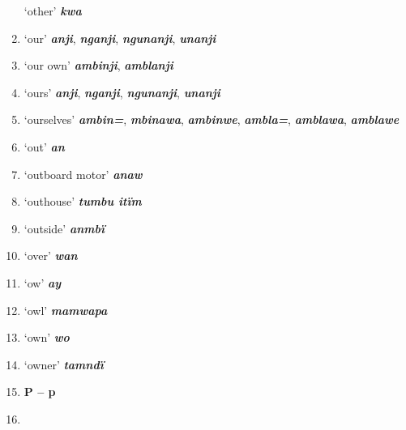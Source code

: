 \begin{enumerate}[noitemsep, label={}, align=left, widest=190, labelsep=1ex,leftmargin=*,itemindent=-10pt]
‘other’ \textbf{\textit{kwa}} \item
‘our’ \textbf{\textit{anji}}, \textbf{\textit{nganji}}, \textbf{\textit{ngunanji}}, \textbf{\textit{unanji}} \item
‘our own’ \textbf{\textit{ambinji}}, \textbf{\textit{amblanji}} \item
‘ours’ \textbf{\textit{anji}}, \textbf{\textit{nganji}}, \textbf{\textit{ngunanji}}, \textbf{\textit{unanji}} \item
‘ourselves’ \textbf{\textit{ambin=}}, \textbf{\textit{mbinawa}}, \textbf{\textit{ambinwe}}, \textbf{\textit{ambla=}}, \textbf{\textit{amblawa}}, \textbf{\textit{amblawe}} \item
‘out’ \textbf{\textit{an}} \item
‘outboard motor’ \textbf{\textit{anaw}} \item
‘outhouse’ \textbf{\textit{tumbu itïm}} \item
‘outside’ \textbf{\textit{anmbï}} \item
‘over’ \textbf{\textit{wan}} \item
‘ow’ \textbf{\textit{ay}} \item
‘owl’ \textbf{\textit{mamwapa}} \item
‘own’ \textbf{\textit{wo}} \item
‘owner’ \textbf{\textit{tamndï}}\\ \item

\noindent \textbf{P – p}\\ \item


\end{enumerate}
